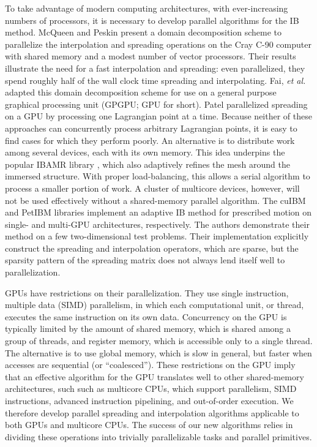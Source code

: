 To take advantage of modern computing architectures, with ever-increasing numbers of
processors, it is necessary to develop parallel algorithms for the IB method.
McQueen and Peskin \cite{McQueen:1997kw} present a domain decomposition scheme to
parallelize the interpolation and spreading operations on the Cray C-90 computer with
shared memory and a modest number of vector processors. Their results illustrate the need
for a fast interpolation and spreading: even parallelized, they spend roughly half of the
wall clock time spreading and interpolating. Fai, \textit{et al.} \cite{Fai:2013do}
adapted this domain decomposition scheme for use on a general purpose graphical
processing unit (GPGPU; GPU for short). Patel \cite{Patel:2012tc} parallelized spreading
on a GPU by processing one Lagrangian point at a time. Because neither of these
approaches can concurrently process arbitrary Lagrangian points, it is easy to find cases
for which they perform poorly. An alternative is to distribute work among several
devices, each with its own memory. This idea underpins the popular IBAMR library
\cite{Griffith:2007uk,Griffith:2007do,Griffith:2009gg, Griffith:2011gi, Griffith:2017id},
which also adaptively refines the mesh around the immersed structure. With proper
load-balancing, this allows a serial algorithm to process a smaller portion of work.
A cluster of multicore devices, however, will not be used effectively without a
shared-memory parallel algorithm. The cuIBM \cite{Layton:2011um} and PetIBM
\cite{Mesnard:2017te,Chuang:2018ej} libraries implement an adaptive IB method for
prescribed motion on single- and multi-GPU architectures, respectively. The authors
demonstrate their method on a few two-dimensional test problems. Their implementation
explicitly construct the spreading and interpolation operators, which are sparse, but the
sparsity pattern of the spreading matrix does not always lend itself well to
parallelization.

GPUs have restrictions on their parallelization. They use single instruction,
multiple data (SIMD) parallelism, in which each computational unit, or thread, executes
the same instruction on its own data. Concurrency on the GPU is typically limited by the
amount of shared memory, which is shared among a group of threads, and register memory, which is
accessible only to a single thread. The alternative is to use global memory, which is
slow in general, but faster when accesses are sequential (or ``coalesced''). These
restrictions on the GPU imply that an effective algorithm for the GPU translates well to
other shared-memory architectures, such such as multicore CPUs, which support
parallelism, SIMD instructions, advanced instruction pipelining, and out-of-order
execution. We therefore develop parallel spreading and interpolation algorithms
applicable to both GPUs and multicore CPUs. The success of our new algorithms relies in
dividing these operations into trivially parallelizable tasks and parallel primitives.

